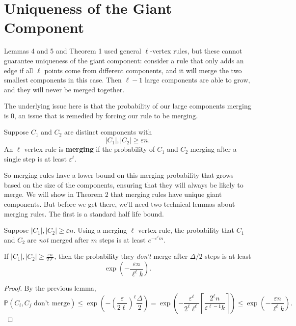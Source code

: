 \documentclass[twoside,10pt]{report}
\begin{document}

\section{Uniqueness of the Giant Component}

Lemmas 4 and 5 and Theorem 1 used general $\ell$-vertex rules, but these cannot guarantee uniqueness of the giant component: consider a rule that only adds an edge if all $\ell$ points come from different components, and it will merge the two smallest components in this case. Then $\ell-1$ large components are able to grow, and they will never be merged together.

The underlying issue here is that the probability of our large components merging is 0, an issue that is remedied by forcing our rule to be merging.

\begin{defn}[]
Suppose $C_1$ and $C_2$ are distinct components with
\[
|C_1|, |C_2| \geq \varepsilon n.
\] An $\ell$-vertex rule is \textbf{merging} if the probability of $C_1$ and $C_2$ merging after a single step is at least $\varepsilon^{\ell}$.
\end{defn}

So merging rules have a lower bound on this merging probability that grows based on the size of the components, ensuring that they will always be likely to merge. We will show in Theorem 2 that merging rules have unique giant components. But before we get there, we'll need two technical lemmas about merging rules. The first is a standard half life bound.

\begin{lem}
Suppose $|C_1|,|C_2| \geq \varepsilon n$. Using a merging $\ell$-vertex rule, the probability that $C_1$ and $C_2$ are \textit{not} merged after $m$ steps is at least $e^{-\varepsilon^{\ell}m}$.
\end{lem}

\begin{cor}
	If $|C_1|,|C_2| \geq \frac{\varepsilon n}{2\ell} $, then the probability they \textit{don't} merge after $\Delta/2$ steps is at least
	\[
		\exp\left(-\frac{\varepsilon n}{\ell^\ell k}\right).
	\] 
\end{cor}
\begin{proof}
	By the previous lemma,
	\[
		\mathbb{P}(C_i, C_j \text{ don't merge}) \leq \exp\left( - \left(\frac{\varepsilon}{2\ell} \right)^{\ell} \frac{\Delta}{2}  \right) = \exp\left( - \frac{\varepsilon^{\ell}}{2^{\ell}\ell^{\ell}} \left\lceil \frac{2^{\ell}n}{\varepsilon^{\ell-1}k} \right\rceil \right) \leq \exp\left( -\frac{\varepsilon n}{\ell^{\ell}k}  \right).
	\] 
\end{proof}
\end{document}
